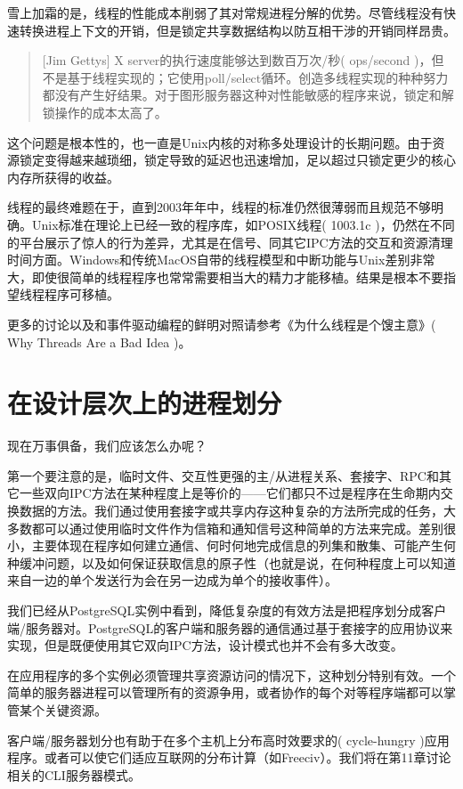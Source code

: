 \documentclass[12pt,oneside]{book}
\begin{document}
\begin{common-format}
雪上加霜的是，线程的性能成本削弱了其对常规进程分解的优势。尽管线程没有快速转换进程上下文的开销，但是锁定共享数据结构以防互相干涉的开销同样昂贵。

\begin{quote}[Jim Gettys]
X server的执行速度能够达到数百万次/秒( ops/second )，但不是基于线程实现的；它使用poll/select循环。创造多线程实现的种种努力都没有产生好结果。对于图形服务器这种对性能敏感的程序来说，锁定和解锁操作的成本太高了。
\end{quote}

这个问题是根本性的，也一直是Unix内核的对称多处理设计的长期问题。由于资源锁定变得越来越琐细，锁定导致的延迟也迅速增加，足以超过只锁定更少的核心内存所获得的收益。

线程的最终难题在于，直到2003年年中，线程的标准仍然很薄弱而且规范不够明确。Unix标准在理论上已经一致的程序库，如POSIX线程( 1003.1c )，仍然在不同的平台展示了惊人的行为差异，尤其是在信号、同其它IPC方法的交互和资源清理时间方面。Windows和传统MacOS自带的线程模型和中断功能与Unix差别非常大，即使很简单的线程程序也常常需要相当大的精力才能移植。结果是根本不要指望线程程序可移植。

更多的讨论以及和事件驱动编程的鲜明对照请参考《为什么线程是个馊主意》( Why Threads Are a Bad Idea )\cite{Ousterhout96}。


\section{在设计层次上的进程划分}
现在万事俱备，我们应该怎么办呢？

第一个要注意的是，临时文件、交互性更强的主/从进程关系、套接字、RPC和其它一些双向IPC方法在某种程度上是等价的——它们都只不过是程序在生命期内交换数据的方法。我们通过使用套接字或共享内存这种复杂的方法所完成的任务，大多数都可以通过使用临时文件作为信箱和通知信号这种简单的方法来完成。差别很小，主要体现在程序如何建立通信、何时何地完成信息的列集和散集、可能产生何种缓冲问题，以及如何保证获取信息的原子性（也就是说，在何种程度上可以知道来自一边的单个发送行为会在另一边成为单个的接收事件）。

我们已经从PostgreSQL实例中看到，降低复杂度的有效方法是把程序划分成客户端/服务器对。PostgreSQL的客户端和服务器的通信通过基于套接字的应用协议来实现，但是既便使用其它双向IPC方法，设计模式也并不会有多大改变。

在应用程序的多个实例必须管理共享资源访问的情况下，这种划分特别有效。一个简单的服务器进程可以管理所有的资源争用，或者协作的每个对等程序端都可以掌管某个关键资源。

客户端/服务器划分也有助于在多个主机上分布高时效要求的(  cycle-hungry )应用程序。或者可以使它们适应互联网的分布计算（如Freeciv）。我们将在第11章讨论相关的CLI服务器模式。


\end{common-format}
\end{document}

